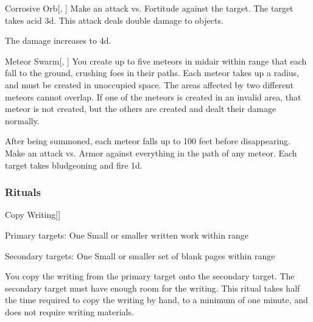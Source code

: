 \lowercase{\hypertarget{spell:Corrosive Orb}{}}\label{spell:Corrosive Orb}
\begin{freeability}[Rank 5]{\hypertarget{spell:Corrosive Orb}{Corrosive Orb}}[, ]
Make an attack vs. Fortitude against the target.
\hit The target takes acid  \plus3d.
This attack deals double damage to objects.

\rankline
{} The damage increases to  \plus4d.
\end{freeability}
\vspace{0.25em}



\lowercase{\hypertarget{spell:Meteor Swarm}{}}\label{spell:Meteor Swarm}
\begin{freeability}[Rank 8]{\hypertarget{spell:Meteor Swarm}{Meteor Swarm}}[, ]
You create up to five meteors in midair within \rnglong range that each fall to the ground, crushing foes in their paths.
Each meteor takes up a \areasmall radius, and must be created in unoccupied space.
The areas affected by two different meteors cannot overlap.
If one of the meteors is created in an invalid area, that meteor is not created, but the others are created and dealt their damage normally.

After being summoned, each meteor falls up to 100 feet before disappearing.
Make an attack vs. Armor against everything in the path of any meteor.
\hit Each target takes bludgeoning and fire  \minus1d.
\end{freeability}
\vspace{0.25em}



\subsubsection{Rituals}


\lowercase{\hypertarget{spell:Copy Writing}{}}\label{spell:Copy Writing}
\begin{freeability}[Rank 1]{\hypertarget{spell:Copy Writing}{Copy Writing}}[]

Primary targets: One Small or smaller written work within \rngclose range
\par\noindent
Secondary targets: One Small or smaller set of blank pages within \rngclose range

You copy the writing from the primary target onto the secondary target.
The secondary target must have enough room for the writing.
This ritual takes half the time required to copy the writing by hand, to a minimum of one minute, and does not require writing materials.
\end{freeability}
\vspace{0.25em}




